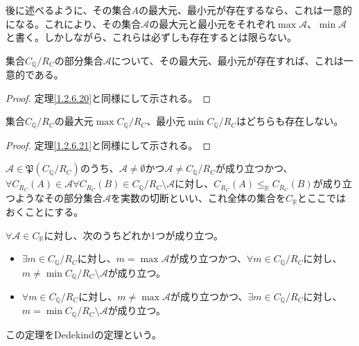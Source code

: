 \documentclass[dvipdfmx]{jsarticle}
\begin{document}
後に述べるように、その集合$A$の最大元、最小元が存在するなら、これは一意的になる。これにより、その集合$\mathcal{A}$の最大元と最小元をそれぞれ$\max\mathcal{A}$、$\min\mathcal{A}$と書く。しかしながら、これらは必ずしも存在するとは限らない。
\begin{thm}\label{1.2.6.38}
集合$C_{\mathbb{Q}} /R_{C} $の部分集合$\mathcal{A}$について、その最大元、最小元が存在すれば、これは一意的である。
\end{thm}
\begin{proof}
定理\ref{1.2.6.20}と同様にして示される。
\end{proof}
\begin{thm}\label{1.2.6.39}
集合$C_{\mathbb{Q}} /R_{C} $の最大元$\max C_{\mathbb{Q}} /R_{C} $、最小元$\min C_{\mathbb{Q}} /R_{C} $はどちらも存在しない。
\end{thm}
\begin{proof}
定理\ref{1.2.6.21}と同様にして示される。
\end{proof}
\begin{dfn}[実数の切断]
$\mathcal{A \in}\mathfrak{P}\left( C_{\mathbb{Q}} /R_{C}  \right)$のうち、$\mathcal{A \neq \emptyset}$かつ$\mathcal{A \neq}C_{\mathbb{Q}} /R_{C} $が成り立つかつ、$\forall C_{R_{C}}(A)\in \mathcal{A\forall}C_{R_{C}}(B) \in C_{\mathbb{Q}} /R_{C} \mathcal{\setminus A}$に対し、$C_{R_{C}}(A) \leq_{\mathbb{R}}C_{R_{C}}(B)$が成り立つようなその部分集合$\mathcal{A}$を実数の切断といい、これ全体の集合を$C_{\mathbb{R}}$とここではおくことにする。
\end{dfn}
\begin{thm}[Dedekindの定理]\label{1.2.6.40}
$\mathcal{\forall A \in}C_{\mathbb{R}}$に対し、次のうちどれか1つが成り立つ。
\begin{itemize}
\item
  $\exists m \in C_{\mathbb{Q}} /R_{C} $に対し、$m = \max\mathcal{A}$が成り立つかつ、$\forall m \in C_{\mathbb{Q}} /R_{C} $に対し、$m \neq \min{C_{\mathbb{Q}} /R_{C} \mathcal{\setminus A}}$が成り立つ。
\item
  $\forall m \in C_{\mathbb{Q}} /R_{C} $に対し、$m \neq \max\mathcal{A}$が成り立つかつ、$\exists m \in C_{\mathbb{Q}} /R_{C} $に対し、$m = \min{C_{\mathbb{Q}} /R_{C} \mathcal{\setminus A}}$が成り立つ。
\end{itemize}
\end{thm}\par
この定理をDedekindの定理という。
\end{document}

